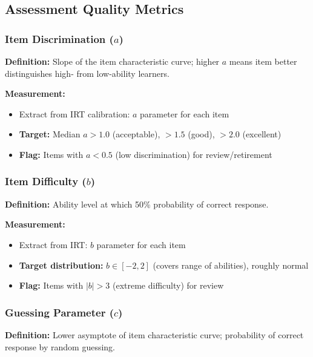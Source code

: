 \documentclass[11pt,letterpaper]{article}
\begin{document}
\subsection{Assessment Quality Metrics}\label{subsec:assessment-quality-metrics}

\subsubsection{Item Discrimination ($a$)}\label{subsubsec:item-discrimination}

\textbf{Definition:} Slope of the item characteristic curve; higher $a$ means item better distinguishes high- from low-ability learners.

\textbf{Measurement:}
\begin{itemize}
\item Extract from IRT calibration: $a$ parameter for each item
\item \textbf{Target:} Median $a > 1.0$ (acceptable), $> 1.5$ (good), $> 2.0$ (excellent)
\item \textbf{Flag:} Items with $a < 0.5$ (low discrimination) for review/retirement
\end{itemize}

\subsubsection{Item Difficulty ($b$)}\label{subsubsec:item-difficulty}

\textbf{Definition:} Ability level at which 50\% probability of correct response.

\textbf{Measurement:}
\begin{itemize}
\item Extract from IRT: $b$ parameter for each item
\item \textbf{Target distribution:} $b \in [-2, 2]$ (covers range of abilities), roughly normal
\item \textbf{Flag:} Items with $|b| > 3$ (extreme difficulty) for review
\end{itemize}

\subsubsection{Guessing Parameter ($c$)}\label{subsubsec:guessing-parameter}

\textbf{Definition:} Lower asymptote of item characteristic curve; probability of correct response by random guessing.
\end{document}

